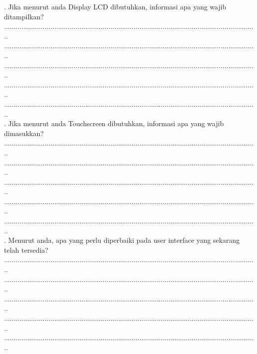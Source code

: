 \documentclass[12pt,]{article}
\begin{document}
	\vspace*{10pt}
	
	. Jika menurut anda Display LCD dibutuhkan, informasi apa yang wajib ditampilkan?\\
	...................................................................................................................................\\
	...................................................................................................................................\\
	...................................................................................................................................\\
	...................................................................................................................................\\
	...................................................................................................................................\\
	
	. Jika menurut anda Touchscreen dibutuhkan, informasi apa yang wajib dimasukkan?\\
	...................................................................................................................................\\
	...................................................................................................................................\\
	...................................................................................................................................\\
	...................................................................................................................................\\
	...................................................................................................................................\\
	
	. Menurut anda, apa yang perlu diperbaiki pada user interface yang sekarang telah tersedia?\\
	...................................................................................................................................\\
	...................................................................................................................................\\
	...................................................................................................................................\\
	...................................................................................................................................\\
	...................................................................................................................................\\
	
\end{document}
